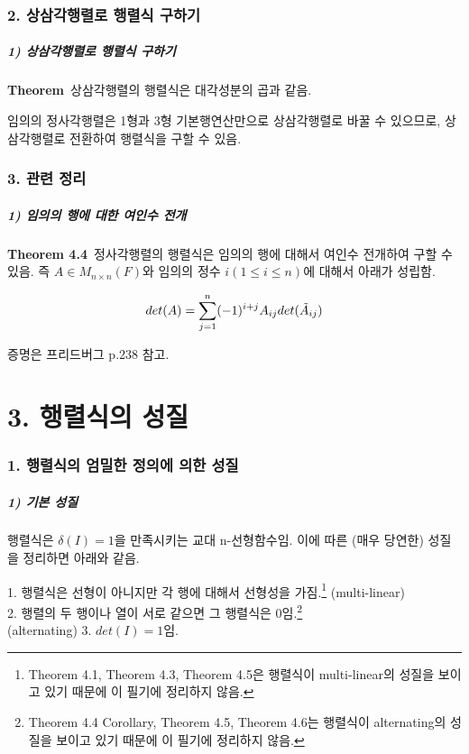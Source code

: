 \newpage


\section*{2. 상삼각행렬로 행렬식 구하기}
\subsubsection*{1) 상삼각행렬로 행렬식 구하기}
\textbf{Theorem}\, 상삼각행렬의 행렬식은 대각성분의 곱과 같음.

임의의 정사각행렬은 1형과 3형 기본행연산만으로 상삼각행렬로 바꿀 수 있으므로, 상삼각행렬로 전환하여 행렬식을 구할 수 있음.


\section*{3. 관련 정리}
\subsubsection*{1) 임의의 행에 대한 여인수 전개}
\textbf{Theorem 4.4}\, 정사각행렬의 행렬식은 임의의 행에 대해서 여인수 전개하여 구할 수 있음. 즉 $A \in M_{n \times n}(F)$와 임의의 정수 $i(1 \leq i \leq n)$에 대해서 아래가 성립함.

\[
det(A)=\sum^{n}_{j=1}(-1)^{i+j}A_{ij}det(\Tilde{A}_{ij})
\]

증명은 프리드버그 p.238 참고.\\


\newpage


\part*{3. 행렬식의 성질}

\section*{1. 행렬식의 엄밀한 정의에 의한 성질}
\subsubsection*{1) 기본 성질}
행렬식은 $\delta(I)=1$을 만족시키는 교대 n-선형함수임. 이에 따른 (매우 당연한) 성질을 정리하면 아래와 같음.

1. 행렬식은 선형이 아니지만 각 행에 대해서 선형성을 가짐.\footnote{Theorem 4.1, Theorem 4.3, Theorem 4.5은 행렬식이 multi-linear의 성질을 보이고 있기 때문에 이 필기에 정리하지 않음.} (multi-linear)\\
2. 행렬의 두 행이나 열이 서로 같으면 그 행렬식은 0임.\footnote{Theorem 4.4 Corollary, Theorem 4.5, Theorem 4.6는 행렬식이 alternating의 성질을 보이고 있기 때문에 이 필기에 정리하지 않음.}\\ (alternating)
3. $det(I)=1$임.

